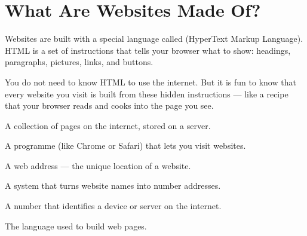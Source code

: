 
\sectionrule

\section*{What Are Websites Made Of?}

Websites are built with a special language called 
(HyperText Markup Language).
HTML is a set of instructions that tells your browser what to show:
headings, paragraphs, pictures, links, and buttons.

You do not need to know HTML to use the internet.
But it is fun to know that every website you visit is built from
these hidden instructions — like a recipe that your browser reads and cooks into the page you see.

\sectionrule

\begin{newwords}
  \begin{description}[labelwidth=3.2cm, leftmargin=3.4cm]
    \item[\term{Website}]  A collection of pages on the internet, stored on a server.
    \item[\term{Browser}]  A programme (like Chrome or Safari) that lets you visit websites.
    \item[\term{URL}]      A web address — the unique location of a website.
    \item[\term{DNS}]      A system that turns website names into number addresses.
    \item[\term{IP address}] A number that identifies a device or server on the internet.
    \item[\term{HTML}]     The language used to build web pages.
  \end{description}
\end{newwords}

\sectionrule

